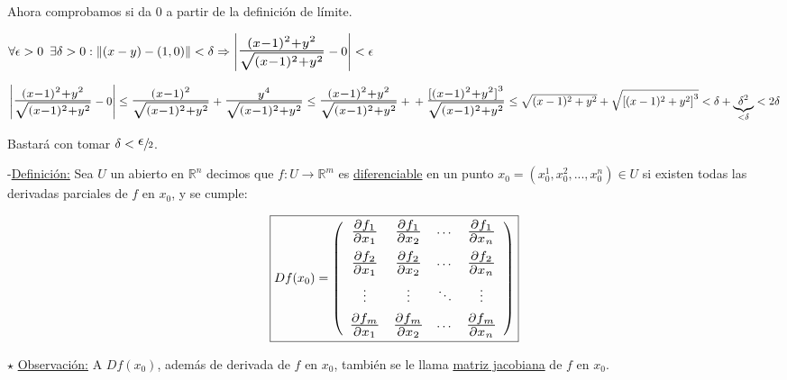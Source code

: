 \documentclass[12pt, titlepage]{article}
\newcommand{\R}{\mathbb{R}}
\newcommand{\bfrac}[2]{\scalebox{1.4}{$\frac{#1}{#2}$}}
\newcommand{\spac}{\, \, \,}
\newcommand{\definicion}{\noindent-\underline{Definición:} }
\newcommand{\observacion}{\noindent$\star$ \underline{Observación:} }
\begin{document}
Ahora comprobamos si da 0 a partir de la definición de límite.
\vspace{2mm}

$\forall \epsilon > 0 \spac \exists \delta > 0 : \|(x - y) - (1, 0)\| < \delta \Rightarrow \left | \bfrac{(x - 1)^2 
+ y^2}{\sqrt{(x - 1)^2 + y^2}} - 0 \right | < \epsilon$
\vspace{3mm}

$\left | \bfrac{(x - 1)^2 + y^2}{\sqrt{(x - 1)^2 + y^2}} - 0 \right | \leq \bfrac{(x - 1)^2}{\sqrt{(x - 1)^2 + 
y^2}} + \bfrac{y^4}{\sqrt{(x - 1)^2 + y^2}} \leq \bfrac{(x - 1)^2 + y^2}{\sqrt{(x - 1)^2 + y^2}} + \\ + 
\bfrac{{[(x - 1)^2 + y^2]}^3}{\sqrt{(x - 1)^2 + y^2}} \leq \sqrt{(x - 1)^2 + y^2} + \sqrt{{[(x - 1)^2 + 
y^2]}^3} < \delta + \underbrace{\delta^2}_{< \delta} < 2 \delta$
\vspace{2mm}

Bastará con tomar $\delta < \sfrac{\scalebox{1.5}{$\epsilon$}}{2}$.
\vspace{5mm}

\definicion Sea $U$ un abierto en $\R^n$ decimos que $f : U  \to \R^m$ es \underline{diferenciable} en un 
punto $x_0 = (x_0^1, x_0^2,..., x_0^n) \in U$ si existen todas las derivadas parciales de $f \text{ en } x_0$, 
y se cumple:

\[
\boxed{
Df(x_0) = 
\left ( \begin{array}{cccc}

\bfrac{\partial f_1}{\partial x_1} & \bfrac{\partial f_1}{\partial x_2} & \cdots & \bfrac{\partial f_1}{\partial 
x_n}\vspace{2mm}\\
\bfrac{\partial f_2}{\partial x_1} & \bfrac{\partial f_2}{\partial x_2} & \cdots & \bfrac{\partial f_2}{\partial 
x_n}\vspace{2mm}\\
\vdots & \vdots & \ddots & \vdots\vspace{2mm}\\
\bfrac{\partial f_m}{\partial x_1} & \bfrac{\partial f_m}{\partial x_2} & \cdots & \bfrac{\partial f_m}{\partial 
x_n}\\

\end{array} \right )
}
\vspace{5mm}
\]

\observacion A $Df (x_0)$, además de derivada de $f \text{ en } x_0$, también se le llama \underline{matriz 
jacobiana} de $f \text{ en } x_0$.
\vspace{7mm}
\end{document}
